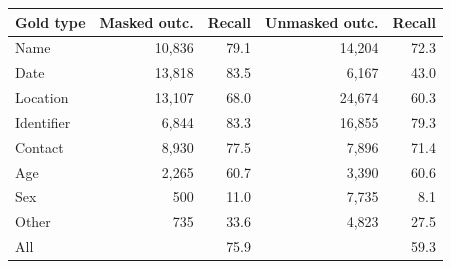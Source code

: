 \begin{tabular}{lrrrr}
\toprule
Gold type & Masked outc. & Recall & Unmasked outc. & Recall\\
\midrule
Name & 10{,}836 & 79.1 & 14{,}204 & 72.3\\
Date & 13{,}818 & 83.5 & 6{,}167 & 43.0\\
Location & 13{,}107 & 68.0 & 24{,}674 & 60.3\\
Identifier & 6{,}844 & 83.3 & 16{,}855 & 79.3\\
Contact & 8{,}930 & 77.5 & 7{,}896 & 71.4\\
Age & 2{,}265 & 60.7 & 3{,}390 & 60.6\\
Sex & 500 & 11.0 & 7{,}735 & 8.1\\
Other & 735 & 33.6 & 4{,}823 & 27.5\\
\midrule
All & & 75.9 & & 59.3\\
\bottomrule
\end{tabular}
